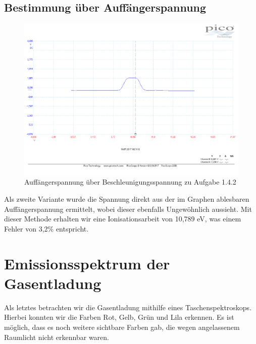 \subsection{Bestimmung über Auffängerspannung}
\begin{figure}
	\includegraphics[width=\textwidth]{../Daten/Aufgabe1/Frank_Hertz_1_4_b_2.pdf}
	\caption{Auffängerspannung über Beschleunigungsspannung zu Aufgabe 1.4.2}
\end{figure}
Als zweite Variante wurde die Spannung direkt aus der im Graphen ablesbaren Auffängerspannung ermittelt, wobei dieser ebenfalls Ungewöhnlich aussieht. Mit dieser Methode erhalten wir eine Ionisationsarbeit von 10,789 eV, was einem Fehler von 3,2\% entspricht.
\section{Emissionsspektrum der Gasentladung}
Als letztes betrachten wir die Gasentladung mithilfe eines Taschenspektroskops. Hierbei konnten wir die Farben Rot, Gelb, Grün und Lila erkennen. Es ist möglich, dass es noch weitere sichtbare Farben gab, die wegen angelassenem Raumlicht nicht erkennbar waren.
